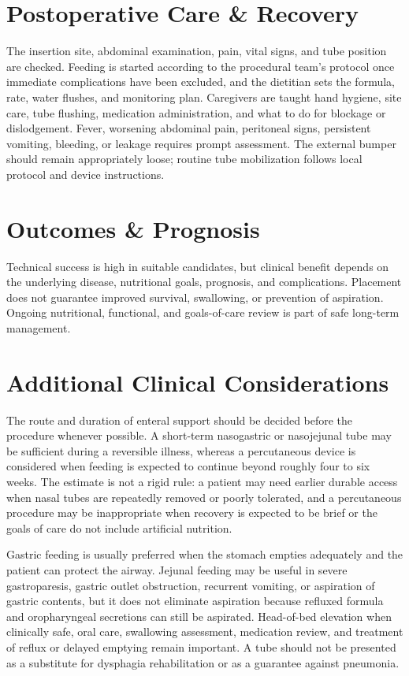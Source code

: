 \section*{Postoperative Care \& Recovery}
The insertion site, abdominal examination, pain, vital signs, and tube position are checked. Feeding is started according to the procedural team's protocol once immediate complications have been excluded, and the dietitian sets the formula, rate, water flushes, and monitoring plan. Caregivers are taught hand hygiene, site care, tube flushing, medication administration, and what to do for blockage or dislodgement. Fever, worsening abdominal pain, peritoneal signs, persistent vomiting, bleeding, or leakage requires prompt assessment. The external bumper should remain appropriately loose; routine tube mobilization follows local protocol and device instructions.

\section*{Outcomes \& Prognosis}
Technical success is high in suitable candidates, but clinical benefit depends on the underlying disease, nutritional goals, prognosis, and complications. Placement does not guarantee improved survival, swallowing, or prevention of aspiration. Ongoing nutritional, functional, and goals-of-care review is part of safe long-term management.

\section*{Additional Clinical Considerations}
The route and duration of enteral support should be decided before the procedure whenever possible. A short-term nasogastric or nasojejunal tube may be sufficient during a reversible illness, whereas a percutaneous device is considered when feeding is expected to continue beyond roughly four to six weeks. The estimate is not a rigid rule: a patient may need earlier durable access when nasal tubes are repeatedly removed or poorly tolerated, and a percutaneous procedure may be inappropriate when recovery is expected to be brief or the goals of care do not include artificial nutrition.

Gastric feeding is usually preferred when the stomach empties adequately and the patient can protect the airway. Jejunal feeding may be useful in severe gastroparesis, gastric outlet obstruction, recurrent vomiting, or aspiration of gastric contents, but it does not eliminate aspiration because refluxed formula and oropharyngeal secretions can still be aspirated. Head-of-bed elevation when clinically safe, oral care, swallowing assessment, medication review, and treatment of reflux or delayed emptying remain important. A tube should not be presented as a substitute for dysphagia rehabilitation or as a guarantee against pneumonia.

